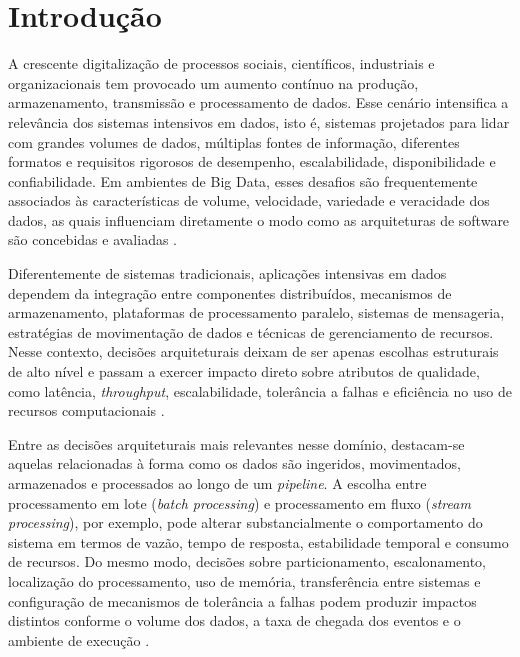 \chapter{Introdução}
\label{cap:introducao}

A crescente digitalização de processos sociais, científicos, industriais e organizacionais tem provocado um aumento contínuo na produção, armazenamento, transmissão e processamento de dados. Esse cenário intensifica a relevância dos sistemas intensivos em dados, isto é, sistemas projetados para lidar com grandes volumes de dados, múltiplas fontes de informação, diferentes formatos e requisitos rigorosos de desempenho, escalabilidade, disponibilidade e confiabilidade. Em ambientes de Big Data, esses desafios são frequentemente associados às características de volume, velocidade, variedade e veracidade dos dados, as quais influenciam diretamente o modo como as arquiteturas de software são concebidas e avaliadas \cite{dai2019big,hilbert2016big}.

Diferentemente de sistemas tradicionais, aplicações intensivas em dados dependem da integração entre componentes distribuídos, mecanismos de armazenamento, plataformas de processamento paralelo, sistemas de mensageria, estratégias de movimentação de dados e técnicas de gerenciamento de recursos. Nesse contexto, decisões arquiteturais deixam de ser apenas escolhas estruturais de alto nível e passam a exercer impacto direto sobre atributos de qualidade, como latência, \textit{throughput}, escalabilidade, tolerância a falhas e eficiência no uso de recursos computacionais \cite{mattmann2004software,ji2020quality,kleppmann2017designing}.

Entre as decisões arquiteturais mais relevantes nesse domínio, destacam-se aquelas relacionadas à forma como os dados são ingeridos, movimentados, armazenados e processados ao longo de um \textit{pipeline}. A escolha entre processamento em lote (\textit{batch processing}) e processamento em fluxo (\textit{stream processing}), por exemplo, pode alterar substancialmente o comportamento do sistema em termos de vazão, tempo de resposta, estabilidade temporal e consumo de recursos. Do mesmo modo, decisões sobre particionamento, escalonamento, localização do processamento, uso de memória, transferência entre sistemas e configuração de mecanismos de tolerância a falhas podem produzir impactos distintos conforme o volume dos dados, a taxa de chegada dos eventos e o ambiente de execução \cite{haynes2016pipegen,wang2018hard,aung2019coordinate,lyu2022fine}.

